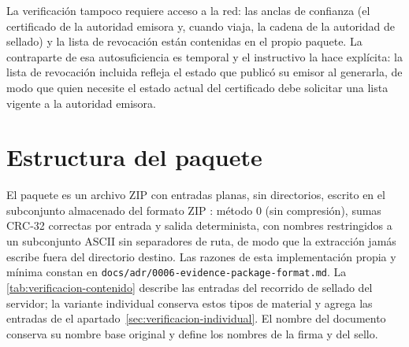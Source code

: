 La verificación tampoco requiere acceso a la red: las anclas de confianza (el certificado de la autoridad emisora y, cuando viaja, la cadena de la autoridad de sellado) y la lista de revocación están contenidas en el propio paquete. La contraparte de esa autosuficiencia es temporal y el instructivo la hace explícita: la lista de revocación incluida refleja el estado que publicó su emisor al generarla, de modo que quien necesite el estado actual del certificado debe solicitar una lista vigente a la autoridad emisora.

\section{Estructura del paquete}\label{sec:verificacion-estructura}

El paquete es un archivo ZIP con entradas planas, sin directorios, escrito en el subconjunto almacenado del formato ZIP \cite{pkware2022}: método 0 (sin compresión), sumas CRC-32 correctas por entrada y salida determinista, con nombres restringidos a un subconjunto ASCII sin separadores de ruta, de modo que la extracción jamás escribe fuera del directorio destino. Las razones de esta implementación propia y mínima constan en \texttt{docs/adr/0006-evidence-package-format.md}. La \cref{tab:verificacion-contenido} describe las entradas del recorrido de sellado del servidor; la variante individual conserva estos tipos de material y agrega las entradas de el apartado~\ref{sec:verificacion-individual}. El nombre del documento conserva su nombre base original y define los nombres de la firma y del sello.

